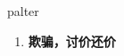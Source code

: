 
\begin{frame}
{\huge palter}
\begin{center}
\begin{enumerate}\Large
  \item \textbf{欺骗，讨价还价}
\end{enumerate}
\end{center}
\end{frame}
